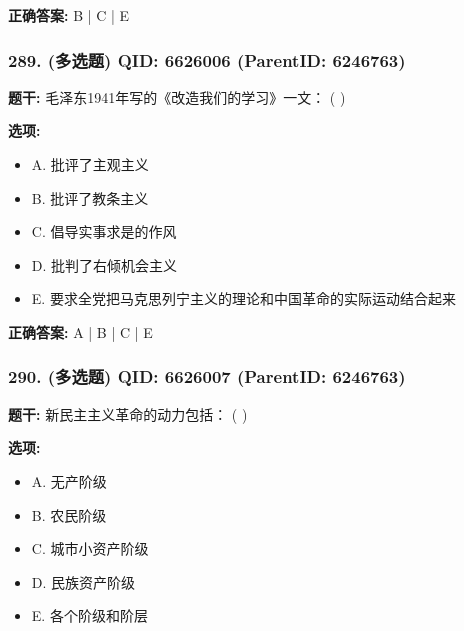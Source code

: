 \documentclass[12pt,UTF8]{ctexart}
\begin{document}
\textbf{正确答案:}
B | C | E

\vspace{0.3em}\hrulefill\vspace{0.7em}

\subsubsection*{289. (多选题) \small QID: 6626006 (ParentID: 6246763)}

\textbf{题干:}
毛泽东1941年写的《改造我们的学习》一文： ( )



\textbf{选项:}
\begin{itemize}[leftmargin=*]

  \item A. 批评了主观主义

  \item B. 批评了教条主义

  \item C. 倡导实事求是的作风

  \item D. 批判了右倾机会主义

  \item E. 要求全党把马克思列宁主义的理论和中国革命的实际运动结合起来

\end{itemize}

\textbf{正确答案:}
A | B | C | E

\vspace{0.3em}\hrulefill\vspace{0.7em}

\subsubsection*{290. (多选题) \small QID: 6626007 (ParentID: 6246763)}

\textbf{题干:}
新民主主义革命的动力包括： ( )



\textbf{选项:}
\begin{itemize}[leftmargin=*]

  \item A. 无产阶级

  \item B. 农民阶级

  \item C. 城市小资产阶级

  \item D. 民族资产阶级

  \item E. 各个阶级和阶层

\end{itemize}
\end{document}

